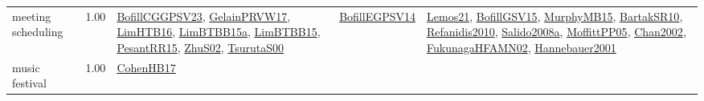 {\begin{longtable}{p{3cm}r>{\raggedright\arraybackslash}p{6cm}>{\raggedright\arraybackslash}p{6cm}>{\raggedright\arraybackslash}p{8cm}}
\index{meeting scheduling}\index{ApplicationAreas!meeting scheduling}meeting scheduling &  1.00 & \hyperref[detail:BofillCGGPSV23]{BofillCGGPSV23}, \hyperref[detail:GelainPRVW17]{GelainPRVW17}, \hyperref[detail:LimHTB16]{LimHTB16}, \hyperref[detail:LimBTBB15a]{LimBTBB15a}, \hyperref[detail:LimBTBB15]{LimBTBB15}, \hyperref[detail:PesantRR15]{PesantRR15}, \hyperref[detail:ZhuS02]{ZhuS02}, \hyperref[detail:TsurutaS00]{TsurutaS00} & \hyperref[detail:BofillEGPSV14]{BofillEGPSV14} & \hyperref[detail:Lemos21]{Lemos21}, \hyperref[detail:BofillGSV15]{BofillGSV15}, \hyperref[detail:MurphyMB15]{MurphyMB15}, \hyperref[detail:BartakSR10]{BartakSR10}, \hyperref[detail:Refanidis2010]{Refanidis2010}, \hyperref[detail:Salido2008a]{Salido2008a}, \hyperref[detail:MoffittPP05]{MoffittPP05}, \hyperref[detail:Chan2002]{Chan2002}, \hyperref[detail:FukunagaHFAMN02]{FukunagaHFAMN02}, \hyperref[detail:Hannebauer2001]{Hannebauer2001}\\
\index{music festival}\index{ApplicationAreas!music festival}music festival &  1.00 & \hyperref[detail:CohenHB17]{CohenHB17} &  & \\

\end{longtable}}
